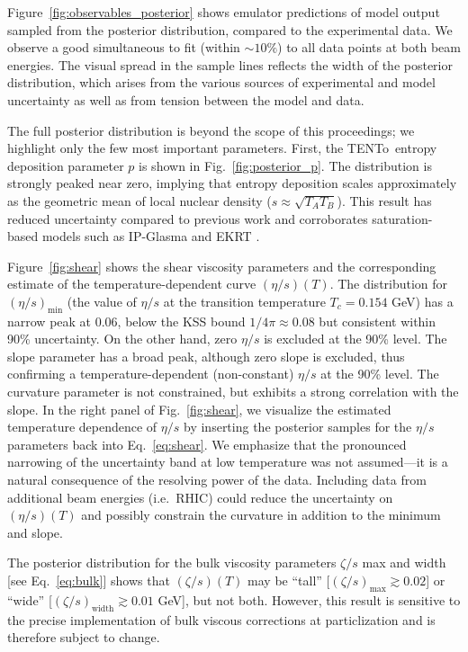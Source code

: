 \documentclass[3p,times,procedia,sort&compress]{elsarticle}
\newcommand{\trento}{T\raisebox{-0.5ex}{R}ENTo}
\begin{document}
Figure~\ref{fig:observables_posterior} shows emulator predictions of model output sampled from the posterior distribution, compared to the experimental data.
We observe a good simultaneous to fit (within ${\sim}10\%$) to all data points at both beam energies.
The visual spread in the sample lines reflects the width of the posterior distribution, which arises from the various sources of experimental and model uncertainty as well as from tension between the model and data.

The full posterior distribution is beyond the scope of this proceedings;
we highlight only the few most important parameters.
First, the \trento\ entropy deposition parameter $p$ is shown in Fig.~\ref{fig:posterior_p}.
The distribution is strongly peaked near zero, implying that entropy deposition scales approximately as the geometric mean of local nuclear density ($s \approx \sqrt{T_AT_B}$).
This result has reduced uncertainty compared to previous work and corroborates saturation-based models such as IP-Glasma \cite{Schenke:2012wb} and EKRT \cite{Niemi:2015qia}.

Figure~\ref{fig:shear} shows the shear viscosity parameters and the corresponding estimate of the temperature-dependent curve $(\eta/s)(T)$.
The distribution for $(\eta/s)_\text{min}$ (the value of $\eta/s$ at the transition temperature $T_c = 0.154$ GeV) has a narrow peak at 0.06, below the KSS bound $1/4\pi \approx 0.08$ but consistent within 90\% uncertainty.
On the other hand, zero $\eta/s$ is excluded at the 90\% level.
The slope parameter has a broad peak, although zero slope is excluded, thus confirming a temperature-dependent (non-constant) $\eta/s$ at the 90\% level.
The curvature parameter is not constrained, but exhibits a strong correlation with the slope.
In the right panel of Fig.~\ref{fig:shear}, we visualize the estimated temperature dependence of $\eta/s$ by inserting the posterior samples for the $\eta/s$ parameters back into Eq.~\ref{eq:shear}.
We emphasize that the pronounced narrowing of the uncertainty band at low temperature was not assumed---it is a natural consequence of the resolving power of the data.
Including data from additional beam energies (i.e.\ RHIC) could reduce the uncertainty on $(\eta/s)(T)$ and possibly constrain the curvature in addition to the minimum and slope.

The posterior distribution for the bulk viscosity parameters $\zeta/s$ max and width [see Eq.~\eqref{eq:bulk}] shows that $(\zeta/s)(T)$ may be ``tall'' [$(\zeta/s)_\text{max} \gtrsim 0.02$] or ``wide'' [$(\zeta/s)_\text{width} \gtrsim 0.01$ GeV], but not both.
However, this result is sensitive to the precise implementation of bulk viscous corrections at particlization and is therefore subject to change.
\end{document}
